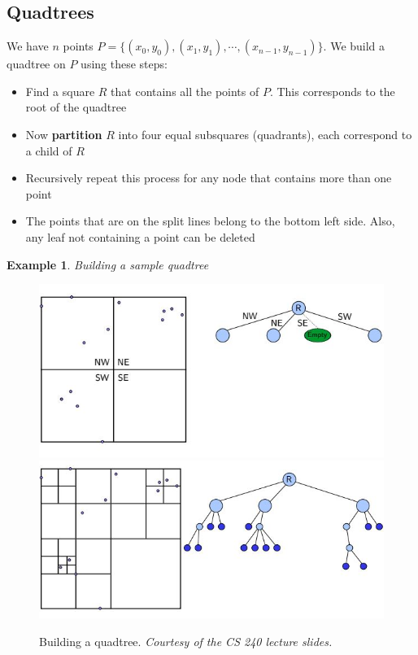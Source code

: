 \documentclass{report}
\newtheorem{ex}{Example}[section]
\begin{document}
\subsection{Quadtrees}
We have $n$ points $P = \{(x_0,y_0), (x_1,y_1), \cdots, (x_{n-1},y_{n-1})\}$. We build a quadtree on $P$ using these steps:
\begin{itemize}
\item Find a square $R$ that contains all the points of $P$. This corresponds to the root of the quadtree
\item Now \textbf{partition} $R$ into four equal subsquares (quadrants), each correspond to a child of $R$
\item Recursively repeat this process for any node that contains more than one point
\item The points that are on the split lines belong to the bottom left side. Also, any leaf not containing a point can be deleted
\end{itemize}
\begin{ex}
Building a sample quadtree
\end{ex}
\begin{figure}[ht]
\begin{center}
\includegraphics[scale=0.55]{quadtree.jpg}
\includegraphics[scale=0.45]{quadtree2.jpg}
\end{center}
\caption{Building a quadtree. \textit{Courtesy of the CS 240 lecture slides.}}
\end{figure}
\newpage
\end{document}

